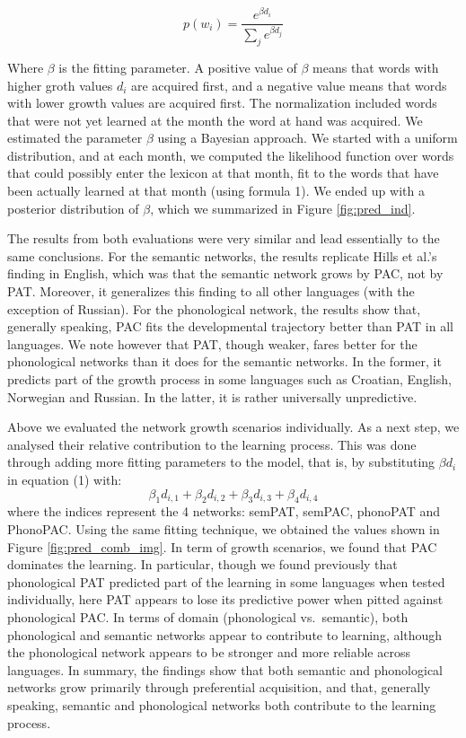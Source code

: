 \documentclass[10pt, letterpaper]{article}
\begin{document}
\begin{equation}
 p(w_i)= \frac{e^{\beta d_i}}{\sum_j e^{\beta d_j} }
\end{equation}

Where \(\beta\) is the fitting parameter. A positive value of \(\beta\)
means that words with higher groth values \(d_i\) are acquired first,
and a negative value means that words with lower growth values are
acquired first. The normalization included words that were not yet
learned at the month the word at hand was acquired. We estimated the
parameter \(\beta\) using a Bayesian approach. We started with a uniform
distribution, and at each month, we computed the likelihood function
over words that could possibly enter the lexicon at that month, fit to
the words that have been actually learned at that month (using formula
1). We ended up with a posterior distribution of \(\beta\), which we
summarized in Figure \ref{fig:pred_ind}.

The results from both evaluations were very similar and lead essentially
to the same conclusions. For the semantic networks, the results
replicate Hills et al.'s finding in English, which was that the semantic
network grows by PAC, not by PAT. Moreover, it generalizes this finding
to all other languages (with the exception of Russian). For the
phonological network, the results show that, generally speaking, PAC
fits the developmental trajectory better than PAT in all languages. We
note however that PAT, though weaker, fares better for the phonological
networks than it does for the semantic networks. In the former, it
predicts part of the growth process in some languages such as Croatian,
English, Norwegian and Russian. In the latter, it is rather universally
unpredictive.

Above we evaluated the network growth scenarios individually. As a next
step, we analysed their relative contribution to the learning process.
This was done through adding more fitting parameters to the model, that
is, by substituting \(\beta d_i\) in equation (1) with:
\[\beta_{1} d_{i, 1} + \beta_{2} d_{i, 2} + \beta_{3} d_{i, 3} + \beta_{4} d_{i, 4}\]
where the indices represent the 4 networks: semPAT, semPAC, phonoPAT and
PhonoPAC. Using the same fitting technique, we obtained the values shown
in Figure \ref{fig:pred_comb_img}. In term of growth scenarios, we found
that PAC dominates the learning. In particular, though we found
previously that phonological PAT predicted part of the learning in some
languages when tested individually, here PAT appears to lose its
predictive power when pitted against phonological PAC. In terms of
domain (phonological vs.~semantic), both phonological and semantic
networks appear to contribute to learning, although the phonological
network appears to be stronger and more reliable across languages. In
summary, the findings show that both semantic and phonological networks
grow primarily through preferential acquisition, and that, generally
speaking, semantic and phonological networks both contribute to the
learning process.
\end{document}
